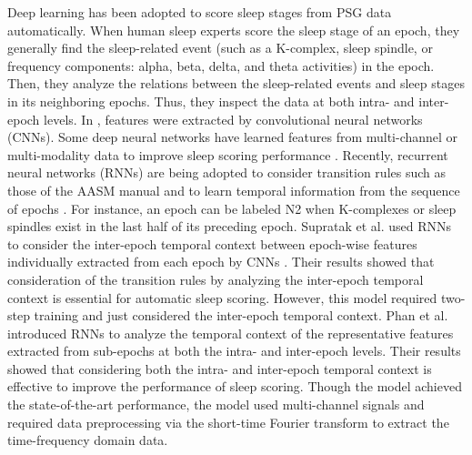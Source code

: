 \documentclass[10pt,twocolumn,twoside]{IEEEtran}
\begin{document}
    Deep learning has been adopted to score sleep stages from PSG data automatically. When human sleep experts score the sleep stage of an epoch, they generally find the sleep-related event (such as a K-complex, sleep spindle, or frequency components: alpha, beta, delta, and theta activities) in the epoch. Then, they analyze the relations between the sleep-related events and sleep stages in its neighboring epochs. Thus, they inspect the data at both intra- and inter-epoch levels. In \cite{sors2018convolutional,chambon2018deep,supratak2017deepsleepnet,vilamala2017deep,tsinalis2016automatic,manor2015convolutional,wulsin2011modeling,mirowski2009classification}, features were extracted by convolutional neural networks (CNNs). Some deep neural networks have learned features from multi-channel or multi-modality data to improve sleep scoring performance \cite{chambon2018deep,o2014montreal,parra2005recipes}. Recently, recurrent neural networks (RNNs) are being adopted to consider transition rules such as those of the AASM manual and to learn temporal information from the sequence of epochs \cite{phan2019seqsleepnet,sors2018convolutional,chambon2018deep,phan2018joint,dong2018mixed,supratak2017deepsleepnet,stephansen2017use,biswal2017sleepnet,tsinalis2016automatic,hsu2013automatic}. For instance, an epoch can be labeled N2 when K-complexes or sleep spindles exist in the last half of its preceding epoch. Supratak et al. used RNNs to consider the inter-epoch temporal context between epoch-wise features individually extracted from each epoch by CNNs \cite{supratak2017deepsleepnet}. Their results showed that consideration of the transition rules by analyzing the inter-epoch temporal context is essential for automatic sleep scoring. However, this model required two-step training and just considered the inter-epoch temporal context. Phan et al. \cite{phan2019seqsleepnet} introduced RNNs to analyze the temporal context of the representative features extracted from sub-epochs at both the intra- and inter-epoch levels. Their results showed that considering both the intra- and inter-epoch temporal context is effective to improve the performance of sleep scoring. Though the model achieved the state-of-the-art performance, the model used multi-channel signals and required data preprocessing via the short-time Fourier transform to extract the time-frequency domain data.
    
\end{document}
